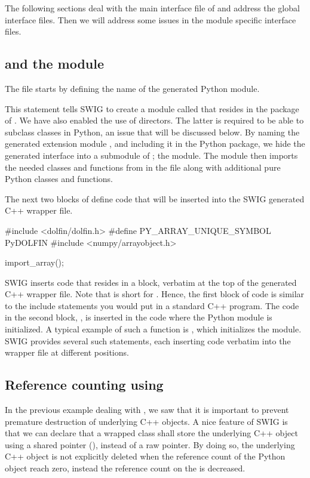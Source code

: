 The following sections deal with the main interface file of 
and address the global interface files. Then we will address some issues
in the module specific interface files.

\subsection{ and the  module}
The file  starts by defining the name of the generated
Python module.
\begin{swigcode}
\end{swigcode}
This statement tells SWIG to create a module called  that
resides in the package of \dolfin{}. We have also enabled the use of
directors.  The latter is required to be able to subclass \dolfin classes
in Python, an issue that will be discussed below.  By naming the generated
extension module , and including it in the \dolfin{} Python
package, we hide the generated interface into a submodule of \dolfin{}; the
 module.  The \dolfin{} module then imports the needed
classes and functions from  in the 
file along with additional pure Python classes and functions.

The next two blocks of  define code that will be inserted
into the SWIG generated C++ wrapper file.
\begin{swigcode}
#include <dolfin/dolfin.h>
#define PY_ARRAY_UNIQUE_SYMBOL PyDOLFIN
#include <numpy/arrayobject.h>

import_array();
\end{swigcode}
SWIG inserts code that resides in a \emp{\%\{$\ldots$\}\%} block,
verbatim at the top of the generated C++ wrapper file. Note that
\emp{\%\{$\ldots$\}\%} is short for . Hence,
the first block of code is similar to the include statements you
would put in a standard C++ program. The code in the second block,
, is inserted in the code where the
Python module is initialized. A typical example of such a function is
, which initializes the \numpy module. SWIG provides
several such statements, each inserting code verbatim into the wrapper
file at different positions.

\subsection{Reference counting using }
In the previous example dealing with , we saw that
it is important to prevent premature destruction of underlying C++
objects. A nice feature of SWIG is that we can declare that a wrapped
class shall store the underlying C++ object using a shared pointer
(), instead of a raw pointer. By doing so, the
underlying C++ object is not explicitly deleted when the reference
count of the Python object reach zero, instead the reference count on
the  is decreased.

